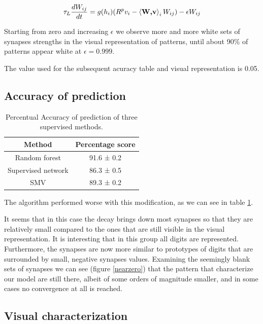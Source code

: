 \documentclass[a4paper]{report}
\begin{document}
\begin{equation}\label{099}
    \tau_L \frac{dW_{ij}}{dt} = g(h_i)(R^p v_i - \braket{\textbf{W,v}}_i W_{ij} ) -\epsilon W_{ij}
\end{equation}

Starting from zero and increasing  $\epsilon$ we observe more and more white sets of synapses strengths in the visual representation of patterns, until about 90\% of patterns appear white at $\epsilon = 0.999$.

The value used for the subsequent acuracy table and visual representation is 0.05.

\subsection{Accuracy of prediction}

\begin{table}[h!]
  \begin{center}
    \begin{tabular}{c|c} %
      \textbf{Method} & \textbf{Percentage score}\\
      \hline
      Random forest & 91.6  ± 0.2\\
      Supervised network & 86.3 ± 0.5\\
      SMV & 89.3 ± 0.2\\
    \end{tabular}
  \end{center}
  \caption{Percentual Accuracy of prediction of three supervised methods.}
  \label{decayT}
\end{table}

The algorithm performed worse with this modification, as we can see in table \ref{decayT}.

It seems that in this case the decay brings down most synapses so that they are relatively small compared to the ones that are still visible in the visual representation.
It is interesting that in this group all digits are represented.
Furthermore, the synapses are now more similar to prototypes of digits that are surrounded by small, negative synapses values.
Examining the seemingly blank sets of synapses we can see (figure \ref{nearzero}) that the pattern that characterize our model are still there, albeit of some orders of magnitude smaller, and in some cases no convergence at all is reached.

\subsection{Visual characterization}
\end{document}
